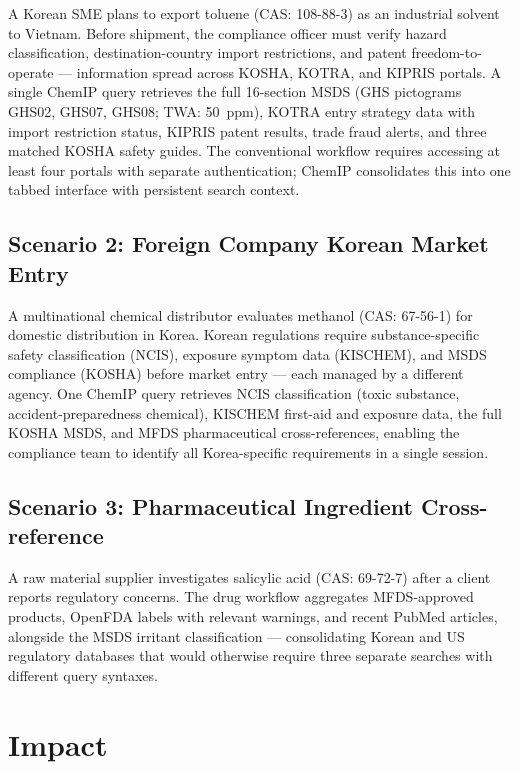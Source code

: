 \documentclass[preprint,12pt]{elsarticle}
\begin{document}
A Korean SME plans to export toluene (CAS: 108-88-3) as an industrial solvent to Vietnam. Before shipment, the compliance officer must verify hazard classification, destination-country import restrictions, and patent freedom-to-operate --- information spread across KOSHA, KOTRA, and KIPRIS portals. A single ChemIP query retrieves the full 16-section MSDS (GHS pictograms GHS02, GHS07, GHS08; TWA: 50~ppm), KOTRA entry strategy data with import restriction status, KIPRIS patent results, trade fraud alerts, and three matched KOSHA safety guides. The conventional workflow requires accessing at least four portals with separate authentication; ChemIP consolidates this into one tabbed interface with persistent search context.

\subsection{Scenario 2: Foreign Company Korean Market Entry}

A multinational chemical distributor evaluates methanol (CAS: 67-56-1) for domestic distribution in Korea. Korean regulations require substance-specific safety classification (NCIS), exposure symptom data (KISCHEM), and MSDS compliance (KOSHA) before market entry --- each managed by a different agency. One ChemIP query retrieves NCIS classification (toxic substance, accident-preparedness chemical), KISCHEM first-aid and exposure data, the full KOSHA MSDS, and MFDS pharmaceutical cross-references, enabling the compliance team to identify all Korea-specific requirements in a single session.

\subsection{Scenario 3: Pharmaceutical Ingredient Cross-reference}

A raw material supplier investigates salicylic acid (CAS: 69-72-7) after a client reports regulatory concerns. The drug workflow aggregates MFDS-approved products, OpenFDA labels with relevant warnings, and recent PubMed articles, alongside the MSDS irritant classification --- consolidating Korean and US regulatory databases that would otherwise require three separate searches with different query syntaxes.


\section{Impact}
\end{document}
